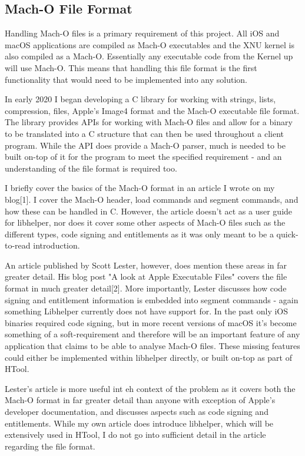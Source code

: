 \subsection{Mach-O File Format}

Handling Mach-O files is a primary requirement of this project. All iOS and macOS applications are compiled as Mach-O executables and the XNU kernel is also compiled as a Mach-O. Essentially any executable code from the Kernel up will use Mach-O. This means that handling this file format is the first functionality that would need to be implemented into any solution.

In early 2020 I began developing a C library for working with strings, lists, compression, files, Apple's Image4 format and the Mach-O executable file format. The library provides APIs for working with Mach-O files and allow for a binary to be translated into a C structure that can then be used throughout a client program. While the API does provide a Mach-O parser, much is needed to be built on-top of it for the program to meet the specified requirement - and an understanding of the file format is required too. 

I briefly cover the basics of the Mach-O format in an article I wrote on my blog[1]. I cover the Mach-O header, load commands and segment commands, and how these can be handled in C. However, the article doesn't act as a user guide for libhelper, nor does it cover some other aspects of Mach-O files such as the different types, code signing and entitlements as it was only meant to be a quick-to-read introduction.

An article published by Scott Lester, however, does mention these areas in far greater detail. His blog post "A look at Apple Executable Files" covers the file format in much greater detail[2]. More importantly, Lester discusses how code signing and entitlement information is embedded into segment commands - again something Libhelper currently does not have support for. In the past only iOS binaries required code signing, but in more recent versions of macOS it's become something of a soft-requirement and therefore will be an important feature of any application that claims to be able to analyse Mach-O files. These missing features could either be implemented within libhelper directly, or built on-top as part of HTool.

Lester's article is more useful int eh context of the problem as it covers both the Mach-O format in far greater detail than anyone with exception of Apple's developer documentation, and discusses aspects such as code signing and entitlements. While my own article does introduce libhelper, which will be extensively used in HTool, I do not go into sufficient detail in the article regarding the file format.